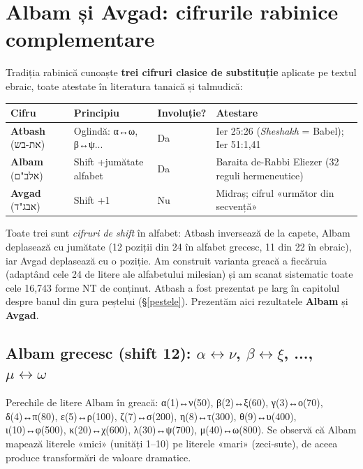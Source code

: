 \documentclass[12pt,a4paper,twoside,openany]{book}
\begin{document}
\section{Albam și Avgad: cifrurile rabinice complementare}\label{albam-avgad}

Tradiția rabinică cunoaște \textbf{trei cifruri clasice de substituție} aplicate pe textul ebraic, toate atestate în literatura tanaică și talmudică:

\begin{center}
\small
\begin{tabular}{L{2.5cm}C{3cm}C{2cm}L{5.5cm}}
\toprule
{}
\textbf{Cifru} & \textbf{Principiu} & \textbf{Involuție?} & \textbf{Atestare} \\
\midrule
\textbf{Atbash} (את-בש) & Oglindă: α↔ω, β↔ψ... & Da & Ier 25:26 (\textit{Sheshakh} = Babel); Ier 51:1,41 \\
\textbf{Albam} (אלב"ם) & Shift +jumătate alfabet & Da & Baraita de-Rabbi Eliezer (32 reguli hermeneutice) \\
\textbf{Avgad} (אבג"ד) & Shift +1 & Nu & Midraș; cifrul «următor din secvență» \\
\bottomrule
\end{tabular}
\end{center}

Toate trei sunt \textit{cifruri de shift} în alfabet: Atbash inversează de la capete, Albam deplasează cu jumătate (12 poziții din 24 în alfabet grecesc, 11 din 22 în ebraic), iar Avgad deplasează cu o poziție. Am construit varianta greacă a fiecăruia (adaptând cele 24 de litere ale alfabetului milesian) și am scanat sistematic toate cele 16{,}743 forme NT de conținut. Atbash a fost prezentat pe larg în capitolul despre banul din gura peștelui (\S\ref{pestele}). Prezentăm aici rezultatele \textbf{Albam} și \textbf{Avgad}.

\subsection{Albam grecesc (shift 12): $\alpha \leftrightarrow \nu$, $\beta \leftrightarrow \xi$, ..., $\mu \leftrightarrow \omega$}

Perechile de litere Albam în greacă: α(1)↔ν(50), β(2)↔ξ(60), γ(3)↔ο(70), δ(4)↔π(80), ε(5)↔ρ(100), ζ(7)↔σ(200), η(8)↔τ(300), θ(9)↔υ(400), ι(10)↔φ(500), κ(20)↔χ(600), λ(30)↔ψ(700), μ(40)↔ω(800). Se observă că Albam mapează literele «mici» (unități 1--10) pe literele «mari» (zeci-sute), de aceea produce transformări de valoare dramatice.
\end{document}
